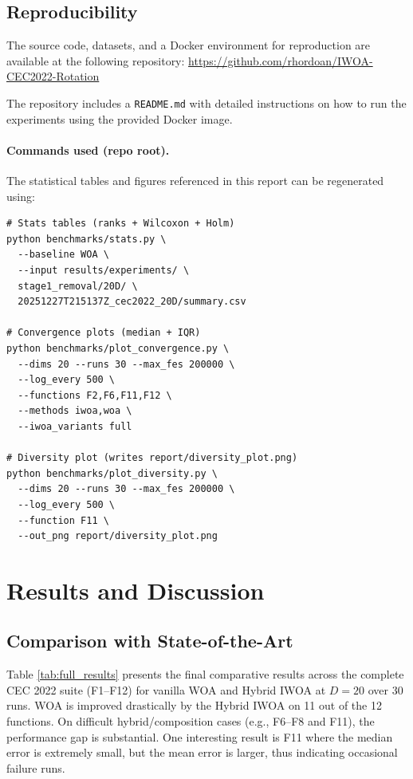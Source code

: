 \documentclass[conference]{IEEEtran}
\begin{document}
\subsection{Reproducibility}
The source code, datasets, and a Docker environment for reproduction are available at the following repository:
\url{https://github.com/rhordoan/IWOA-CEC2022-Rotation}

The repository includes a \texttt{README.md} with detailed instructions on how to run the experiments using the provided Docker image.

\paragraph{Commands used (repo root).}
The statistical tables and figures referenced in this report can be regenerated using:
{\footnotesize
\begin{verbatim}
# Stats tables (ranks + Wilcoxon + Holm)
python benchmarks/stats.py \
  --baseline WOA \
  --input results/experiments/ \
  stage1_removal/20D/ \
  20251227T215137Z_cec2022_20D/summary.csv

# Convergence plots (median + IQR)
python benchmarks/plot_convergence.py \
  --dims 20 --runs 30 --max_fes 200000 \
  --log_every 500 \
  --functions F2,F6,F11,F12 \
  --methods iwoa,woa \
  --iwoa_variants full

# Diversity plot (writes report/diversity_plot.png)
python benchmarks/plot_diversity.py \
  --dims 20 --runs 30 --max_fes 200000 \
  --log_every 500 \
  --function F11 \
  --out_png report/diversity_plot.png
\end{verbatim}
}

\section{Results and Discussion}
\label{sec:results}

\subsection{Comparison with State-of-the-Art}

Table \ref{tab:full_results} presents the final comparative results across the complete CEC 2022 suite (F1--F12) for vanilla WOA and Hybrid IWOA at $D=20$ over 30 runs. WOA is improved drastically by the Hybrid IWOA on 11 out of the 12 functions. On difficult hybrid/composition cases (e.g., F6--F8 and F11), the performance gap is substantial. One interesting result is F11 where the median error is extremely small, but the mean error is larger, thus indicating occasional failure runs.
\end{document}
